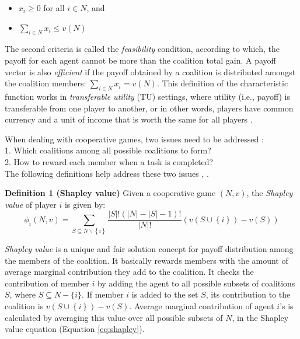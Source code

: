 \documentclass[10pt,journal,cspaper,compsoc]{IEEEtran}
\begin{document}
\begin{itemize}
    \item $x_i \geq 0$ for all $i \in N$, and
    \item $\sum_{i \in N} x_i \leq v(N)$
\end{itemize}


The second criteria is called the \emph{feasibility} condition,
according to which, the payoff for each agent cannot be more than
the coalition total gain. A payoff vector is also \emph{efficient}
if the payoff obtained by a coalition is distributed amongst the
coalition members: $\sum_{i \in N} x_i = v(N)$. This definition of
the characteristic function works in \emph{transferable utility}
(TU) settings, where utility (i.e., payoff) is transferable from
one player to another, or in other words, players have common
currency and a unit of income that is worth the same for all
players \cite{myerson1991game}.


When dealing with cooperative games, two issues need to be
addressed  \cite{
DBLP:conf/ijcai/GrecoMPS11,Sandholm1999209,DBLP:conf/ijcai/RahwanMJ11}:\\ 1. Which coalitions among all possible coalitions to form? \\
2. How to reward each member when a task is completed?\\
%
The following definitions help address these two issues
\cite{shapley_value}, \cite{S1971cores}.


{\bf Definition 1 (Shapley value)} Given a cooperative game $(N,
v)$, the \emph{Shapley value} of player $i$ is given by:
\begin{equation}\label{eq:shapley}
\phi_i(N,v) = \sum_{S \subseteq N \backslash \left\{i\right\} }
\frac{|S|! (|N|-|S|-1)!}{|N|!} (v(S \cup \left\{i\right\}) - v(S))
\end{equation}


\emph{Shapley value} is a unique and fair solution concept for
payoff distribution among the members of the coalition. It
basically rewards members with the amount of average marginal
contribution they add to the coalition. It checks the contribution
of member $i$ by adding the agent to all possible subsets of
coalitions $S$, where $S \subseteq N-\{i\}$. If member $i$ is added to the
set $S$, its contribution to the coalition is $v(S \cup
\left\{i\right\}) - v(S)$. Average marginal contribution of agent
$i$'s is calculated by averaging this value over all possible
subsets of $N$, in the Shapley value equation (Equation
\ref{eq:shapley}).
\end{document}
